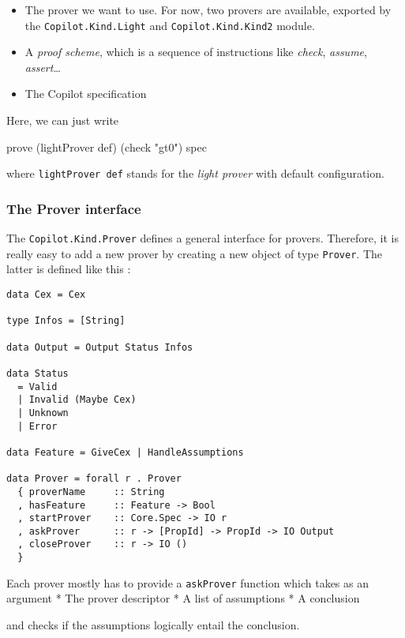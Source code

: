 \begin{itemize}
\itemsep1pt\parskip0pt
\item
  The prover we want to use. For now, two provers are available,
  exported by the \texttt{Copilot.Kind.Light} and
  \texttt{Copilot.Kind.Kind2} module.
\item
  A \emph{proof scheme}, which is a sequence of instructions like
  \emph{check}, \emph{assume}, \emph{assert}\ldots{}
\item
  The Copilot specification
\end{itemize}

Here, we can just write
\begin{code}
prove (lightProver def) (check "gt0") spec
\end{code}

where \texttt{lightProver def} stands for the \emph{light prover} with
default configuration.

\subsubsection{The Prover interface}\label{the-prover-interface}

The \texttt{Copilot.Kind.Prover} defines a general interface for
provers. Therefore, it is really easy to add a new prover by creating a
new object of type \texttt{Prover}. The latter is defined like this :

\begin{lstlisting}[frame=single]
data Cex = Cex

type Infos = [String]

data Output = Output Status Infos

data Status
  = Valid
  | Invalid (Maybe Cex)
  | Unknown
  | Error
  
data Feature = GiveCex | HandleAssumptions
  
data Prover = forall r . Prover 
  { proverName     :: String
  , hasFeature     :: Feature -> Bool
  , startProver    :: Core.Spec -> IO r
  , askProver      :: r -> [PropId] -> PropId -> IO Output 
  , closeProver    :: r -> IO () 
  }

\end{lstlisting}

Each prover mostly has to provide a \texttt{askProver} function which
takes as an argument * The prover descriptor * A list of assumptions * A
conclusion

and checks if the assumptions logically entail the conclusion.

